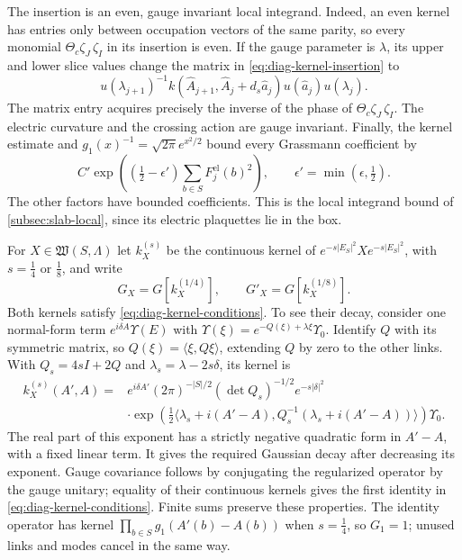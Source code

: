 The insertion is an even, gauge invariant local integrand. Indeed,
an even kernel has entries only between occupation vectors of the
same parity, so every monomial
$\Theta_c\zeta_J\,\zeta_I$ in its insertion is even. If the gauge
parameter is $\lambda$, its upper and lower slice values change
the matrix in \eqref{eq:diag-kernel-insertion} to
\[
 u(\lambda_{j+1})^{-1}
   k(\widehat A_{j+1},\widehat A_j+d_s\widehat a_j)
       u(\widehat a_j)u(\lambda_j).
\]
The matrix entry acquires precisely the inverse of the phase of
$\Theta_c\zeta_J\,\zeta_I$. The electric curvature and the crossing
action are gauge invariant. Finally, the kernel estimate and
$g_1(x)^{-1}=\sqrt{2\pi}e^{x^2/2}$ bound every Grassmann coefficient
by
\begin{equation}\label{eq:diag-insertion-growth}
 C'\exp\left((\tfrac12-\epsilon')
                 \sum_{b\in S}F_j^{\mathrm{el}}(b)^2\right),
 \qquad\epsilon'=\min(\epsilon,\tfrac12).
\end{equation}
The other factors have bounded coefficients. This is the local
integrand bound of \cref{subsec:slab-local}, since its electric
plaquettes lie in the box.

For $X\in\mathfrak W(S,\Lambda)$ let $k_X^{(s)}$ be the continuous
kernel of $e^{-s|E_S|^2}Xe^{-s|E_S|^2}$, with $s=\tfrac14$ or
$\tfrac18$, and write
\begin{equation}\label{eq:diag-operator-insertions}
 G_X=G[k_X^{(1/4)}],\qquad G'_X=G[k_X^{(1/8)}].
\end{equation}
Both kernels satisfy \eqref{eq:diag-kernel-conditions}. To see their
decay, consider one normal-form term $e^{i\delta A}\Upsilon(E)$ with
$\Upsilon(\xi)=e^{-Q(\xi)+\lambda\xi}\Upsilon_0$. Identify $Q$
with its symmetric matrix, so $Q(\xi)=\langle\xi,Q\xi\rangle$,
extending $Q$ by
zero to the other links. With $Q_s=4sI+2Q$ and
$\lambda_s=\lambda-2s\delta$, its kernel is
\begin{equation}\label{eq:diag-regularized-kernel}
 \begin{split}
 k_X^{(s)}(A',A)={}&e^{i\delta A'}(2\pi)^{-|S|/2}
          (\det Q_s)^{-1/2}e^{-s|\delta|^2}\\
 &\cdot\exp\left(\tfrac12
  \langle\lambda_s+i(A'-A),Q_s^{-1}
                  (\lambda_s+i(A'-A))\rangle\right)\Upsilon_0.
 \end{split}
\end{equation}
The real part of this exponent has a strictly negative quadratic
form in $A'-A$, with a fixed linear term. It gives the required
Gaussian decay after decreasing its exponent. Gauge covariance
follows by conjugating the regularized operator by the gauge
unitary; equality of their continuous kernels gives the first
identity in \eqref{eq:diag-kernel-conditions}. Finite sums preserve
these properties. The identity operator has kernel
$\prod_{b\in S}g_1(A'(b)-A(b))$ when $s=\tfrac14$, so
$G_1=1$; unused links and modes cancel in the same way.

